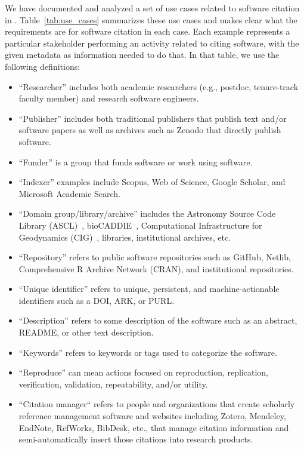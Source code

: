 \documentclass[11pt, oneside]{amsart}
\begin{document}
We have documented and analyzed a set of use cases related to software citation
in \cite{SC-Use-Cases}. Table~\ref{tab:use_cases} summarizes these use cases and
makes clear what the requirements are for software citation in each case.
Each example represents a particular stakeholder performing an activity related to citing software, with the given metadata as information needed to do that.
In that table,
we use the following definitions:
\begin{itemize}

\item ``Researcher'' includes both academic researchers (e.g., postdoc,
tenure-track faculty member) and research software engineers.

\item ``Publisher'' includes both traditional publishers that publish text
and\slash or software papers as well as archives such as Zenodo that directly
publish software.

\item ``Funder'' is a group that funds software or work using software.

\item ``Indexer'' examples include Scopus, Web of Science, Google Scholar,
and Microsoft Academic Search.

\item ``Domain group\slash library\slash archive'' includes the Astronomy Source Code Library (ASCL)~\cite{ascl},
bioCADDIE~\cite{bioCADDIE}, Computational Infrastructure for Geodynamics (CIG)~\cite{CIG}, libraries, institutional archives, etc.

\item ``Repository'' refers to public software repositories such as GitHub, Netlib, Comprehensive R Archive
Network (CRAN), and institutional repositories.

\item ``Unique identifier'' refers to unique, persistent, and machine-actionable identifiers such as a DOI, ARK, or PURL.

\item ``Description'' refers to some description of the software such as an abstract, README, or other text description.

\item ``Keywords'' refers to keywords or tags used to categorize the software.

\item ``Reproduce'' can mean actions focused on reproduction, replication, verification, validation, repeatability, and\slash or utility.

\item ``Citation manager`` refers to people and organizations that create scholarly reference
management software and websites including Zotero, Mendeley, EndNote, RefWorks, BibDesk, etc.,
that manage citation information and semi-automatically insert those citations into research products.

\end{itemize}
\end{document}
